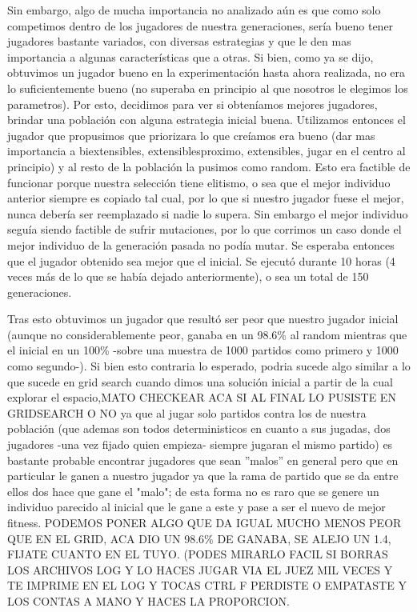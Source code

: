 \documentclass[A4paper,oneside,fleqn,11pt]{article}
\theoremstyle{definition}
\begin{document}
Sin embargo, algo de mucha importancia no analizado aún es que como solo competimos dentro de los jugadores de nuestra generaciones, sería bueno tener jugadores bastante variados, con diversas estrategias y que le den mas importancia a algunas características que a otras. Si bien, como ya se dijo, obtuvimos un jugador bueno en la experimentación hasta ahora realizada, no era lo suficientemente bueno (no superaba en principio al que nosotros le elegimos los parametros). Por esto, decidimos para ver si obteníamos mejores jugadores, brindar una población con alguna estrategia inicial buena. Utilizamos entonces el jugador que propusimos que priorizara lo que creíamos era bueno (dar mas importancia a biextensibles, extensiblesproximo, extensibles, jugar en el centro al principio) y al resto de la población la pusimos como random. Esto era factible de funcionar porque nuestra selección tiene elitismo, o sea que el mejor individuo anterior siempre es copiado tal cual, por lo que si nuestro jugador fuese el mejor, nunca debería ser reemplazado si nadie lo supera. Sin embargo el mejor individuo seguía siendo factible de sufrir mutaciones, por lo que corrimos un caso donde el mejor individuo de la generación pasada no podía mutar. Se esperaba entonces que el jugador obtenido sea mejor que el inicial. Se ejecutó durante 10 horas (4 veces más de lo que se había dejado anteriormente), o sea un total de 150 generaciones. 

Tras esto obtuvimos un jugador que resultó ser peor que nuestro jugador inicial (aunque no considerablemente peor, ganaba en un 98.6\% al random mientras que el inicial en un 100\% -sobre una muestra de 1000 partidos como primero y 1000 como segundo-). Si bien esto contraria lo esperado, podria sucede algo similar a lo que sucede en grid search cuando dimos una solución inicial a partir de la cual explorar el espacio,MATO CHECKEAR ACA SI AL FINAL LO PUSISTE EN GRIDSEARCH O NO ya que al jugar solo partidos contra los de nuestra población (que ademas son todos deterministicos en cuanto a sus jugadas, dos jugadores -una vez fijado quien empieza- siempre jugaran el mismo partido) es bastante probable encontrar jugadores que sean ''malos'' en general pero que en particular le ganen a nuestro jugador ya que la rama de partido que se da entre ellos dos hace que gane el "malo"; de esta forma no es raro que se genere un individuo parecido al inicial que le gane a este y pase a ser el nuevo de mejor fitness. PODEMOS PONER ALGO QUE DA IGUAL MUCHO MENOS PEOR QUE EN EL GRID, ACA DIO UN 98.6\% DE GANABA, SE ALEJO UN 1.4, FIJATE CUANTO EN EL TUYO. (PODES MIRARLO FACIL SI BORRAS LOS ARCHIVOS LOG Y LO HACES JUGAR VIA EL JUEZ MIL VECES Y TE IMPRIME EN EL LOG Y TOCAS CTRL F PERDISTE O EMPATASTE Y LOS CONTAS A MANO Y HACES LA PROPORCION.
\end{document}
